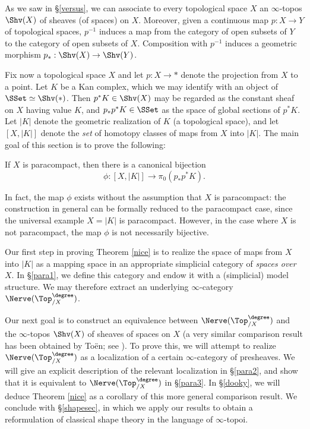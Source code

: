 As we saw in \S \ref{versus}, we can associate to every topological space $X$ an $\infty$-topos $\Shv(X)$ of sheaves (of spaces) on $X$. Moreover, given a continuous map $p: X \rightarrow Y$ of topological spaces, $p^{-1}$ induces a map from the category of open subsets of $Y$ to the category of open subsets of $X$. Composition with $p^{-1}$ induces a geometric morphism $p_{\ast}: \Shv(X) \rightarrow \Shv(Y)$. 

Fix now a topological space $X$ and let $p: X \rightarrow \ast$ denote the projection from $X$ to a point. Let $K$ be a Kan complex, which we may identify with an object of $\SSet \simeq \Shv(\ast)$. 
Then $p^{\ast} K \in \Shv(X)$ may be regarded as the constant sheaf on $X$ having
value $K$, and $p_{\ast} p^{\ast} K \in \SSet$ as the space of global sections of $p^{\ast} K$. 
Let $|K|$ denote the geometric realization of $K$ (a topological space), and let
$[ X, |K| ]$ denote the {\em set} of homotopy classes of maps from $X$ into $|K|$. The main goal of this section is to prove the following:

\begin{theorem}\label{nice}
If $X$ is paracompact, then there is a canonical bijection
$$ \phi: [X, |K| ] \rightarrow \pi_0(p_{\ast} p^{\ast} K).$$
\end{theorem}

\begin{remark}
In fact, the map $\phi$ exists without the assumption that $X$ is paracompact: the construction in general can be formally reduced to the paracompact case, since the universal example $X = |K|$ is paracompact. However, in the case where $X$ is not paracompact, the map $\phi$ is not necessarily bijective.
\end{remark}

Our first step in proving Theorem \ref{nice} is to realize the space of maps
from $X$ into $|K|$ as a mapping space in an appropriate simplicial category
of {\it spaces over $X$}. In \S \ref{para1}, we define this category
and endow it with a (simplicial) model structure. We may therefore extract an underlying $\infty$-category $\Nerve(\Top^{\degree}_{/X})$. 

Our next goal is to construct an equivalence between $\Nerve(\Top_{/X}^{\degree})$ and the $\infty$-topos $\Shv(X)$ of sheaves of spaces on $X$ (a very similar comparison result has been obtained by 
To\"{e}n; see \cite{toen2}). To prove this, we will attempt to realize $\Nerve(\Top_{/X}^{\degree})$ as a localization of a certain $\infty$-category of presheaves. We will give an explicit description of the relevant localization in \S \ref{para2}, and show that it is equivalent to $\Nerve(\Top_{/X}^{\degree})$ in \S \ref{para3}. 
In \S \ref{dooky}, we will deduce Theorem \ref{nice} as a corollary of this more general comparison result. We conclude with \S \ref{shapesec}, in which we apply our results to obtain a reformulation of classical shape theory in the language of $\infty$-topoi.

